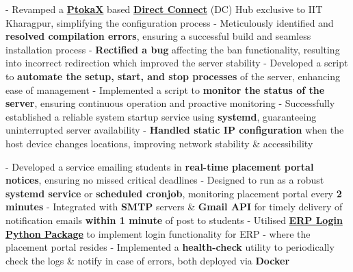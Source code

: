 \documentclass[a4paper,10pt]{extarticle} %
\begin{document}
\begin{description}[style=nextline, font=$\bullet$\hspace{2mm}\normalsize]
\item[{\href{https://github.com/proffapt/Metahub}{Metahub}} | C, Networking, Bash, systemd ]
- Revamped a \href{http://www.ptokax.org/}{\textbf{PtokaX}} based \href{https://en.wikipedia.org/wiki/Direct_Connect_(protocol)}{\textbf{Direct Connect}} (DC) Hub exclusive to IIT Kharagpur, simplifying the configuration process \newline
- Meticulously identified and \textbf{resolved compilation errors}, ensuring a successful build and seamless installation process \newline
- \textbf{Rectified a bug} affecting the ban functionality, resulting into incorrect redirection which improved the server stability \newline
- Developed a script to \textbf{automate the setup, start, and stop processes} of the server, enhancing ease of management \newline
- Implemented a script to \textbf{monitor the status of the server}, ensuring continuous operation and proactive monitoring \newline
- Successfully established a reliable system startup service using \textbf{systemd}, guaranteeing uninterrupted server availability \newline
- \textbf{Handled static IP configuration} when the host device changes locations, improving network stability \& accessibility


 \item[{\href{http://github.com/metakgp/mftp}{MFTP}} | Python, Docker, Gmail API, ERP Login Module, Systemd, Cronjob ]
- Developed a service emailing students in\textbf{ real-time placement portal notices}, ensuring no missed critical deadlines \newline
- Designed to run as a robust \textbf{systemd service} or \textbf{scheduled cronjob}, monitoring  placement portal every \textbf{2 minutes} \newline
- Integrated with \textbf{SMTP} servers \& \textbf{Gmail API} for timely delivery of notification emails \textbf{within 1 minute} of post to students \newline
- Utilised \href{https://github.com/proffapt/iitkgp-erp-login-pypi}{\textbf{ERP Login Python Package}} to implement login functionality for ERP - where the placement portal resides \newline
- Implemented a \textbf{health-check} utility to periodically check the logs \& notify in case of errors, both deployed via \textbf{Docker}


\end{description}
\end{document}
